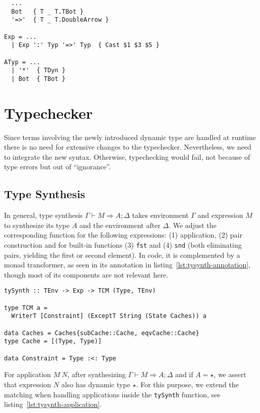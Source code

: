 \begin{lstlisting}[caption=Haskell: Extensions to \texttt{Parsing/Grammar.y}]
%token
  ...
  Bot   { T _ T.TBot }
  '=>'  { T _ T.DoubleArrow }

Exp = ...
  | Exp ':' Typ '=>' Typ  { Cast $1 $3 $5 }

ATyp = ...
  | '*'  { TDyn }
  | Bot  { TBot }
\end{lstlisting}

\section{Typechecker}

Since terms involving the newly introduced dynamic type are handled at runtime there is no need for extensive changes to the typechecker. Nevertheless, we need to integrate the new syntax. Otherwise, typechecking would fail, not because of type errors but out of ``ignorance''.

\subsection{Type Synthesis}

In general, type synthesis $\Gamma \vdash M \Rightarrow A;\Delta$ takes environment $\Gamma$ and expression $M$ to synthesize its type $A$ and the environment after $\Delta$. We adjust the corresponding function for the following expressions: (1) application, (2) pair construction and for built-in functions (3) \texttt{fst} and (4) \texttt{snd} (both eliminating pairs, yielding the first or second element). In code, it is complemented by a monad transformer, as seen in its annotation in listing~\ref{lst:tysynth-annotation}, though most of its components are not relevant here.

\begin{lstlisting}[float,
	caption=Haskell: \texttt{tySynth} function type annotation,
	label=lst:tysynth-annotation]
tySynth :: TEnv -> Exp -> TCM (Type, TEnv)

type TCM a =
  WriterT [Constraint] (ExceptT String (State Caches)) a

data Caches = Caches{subCache::Cache, eqvCache::Cache}
type Cache = [(Type, Type)]

data Constraint = Type :<: Type
\end{lstlisting}

For application $M~N$, after synthesizing $\Gamma \vdash M \Rightarrow A;\Delta$ and if $A = \star$, we assert that expression $N$ also has dynamic type $\star$. For this purpose, we extend the matching when handling applications inside the \texttt{tySynth} function, see listing~\ref{lst:tysynth-application}.

